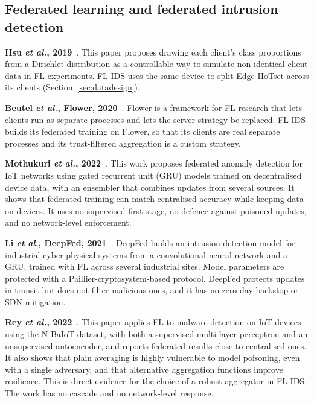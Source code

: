 \subsection{Federated learning and federated intrusion detection}

\textbf{Hsu \emph{et al.}, 2019}~\cite{hsu2019noniid}. This paper proposes drawing each client's class proportions from a Dirichlet distribution as a controllable way to simulate non-identical client data in FL experiments. FL-IDS uses the same device to split Edge-IIoTset across its clients (Section~\ref{sec:datadesign}).

\textbf{Beutel \emph{et al.}, Flower, 2020}~\cite{beutel2020}. Flower is a framework for FL research that lets clients run as separate processes and lets the server strategy be replaced. FL-IDS builds its federated training on Flower, so that its clients are real separate processes and its trust-filtered aggregation is a custom strategy.

\textbf{Mothukuri \emph{et al.}, 2022}~\cite{mothukuri2022fl}. This work proposes federated anomaly detection for IoT networks using gated recurrent unit (GRU) models trained on decentralised device data, with an ensembler that combines updates from several sources. It shows that federated training can match centralised accuracy while keeping data on devices. It uses no supervised first stage, no defence against poisoned updates, and no network-level enforcement.

\textbf{Li \emph{et al.}, DeepFed, 2021}~\cite{li2021deepfed}. DeepFed builds an intrusion detection model for industrial cyber-physical systems from a convolutional neural network and a GRU, trained with FL across several industrial sites. Model parameters are protected with a Paillier-cryptosystem-based protocol. DeepFed protects updates in transit but does not filter malicious ones, and it has no zero-day backstop or SDN mitigation.

\textbf{Rey \emph{et al.}, 2022}~\cite{rey2022}. This paper applies FL to malware detection on IoT devices using the N-BaIoT dataset, with both a supervised multi-layer perceptron and an unsupervised autoencoder, and reports federated results close to centralised ones. It also shows that plain averaging is highly vulnerable to model poisoning, even with a single adversary, and that alternative aggregation functions improve resilience. This is direct evidence for the choice of a robust aggregator in FL-IDS. The work has no cascade and no network-level response.

